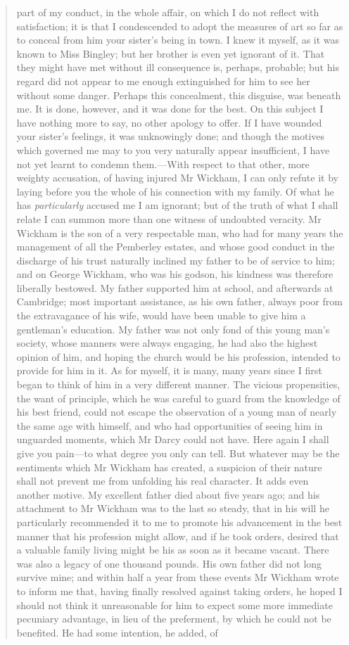 \begin{quotation}
part of my conduct, in the whole affair, on which I do not reflect with satisfaction; it is that I condescended to adopt the measures of art so far as to conceal from him your sister's being in town. I knew it myself, as it was known to Miss Bingley; but her brother is even yet ignorant of it. That they might have met without ill consequence is, perhaps, probable; but his regard did not appear to me enough extinguished for him to see her without some danger. Perhaps this concealment, this disguise, was beneath me. It is done, however, and it was done for the best. On this subject I have nothing more to say, no other apology to offer. If I have wounded your sister's feelings, it was unknowingly done; and though the motives which governed me may to you very naturally appear insufficient, I have not yet learnt to condemn them.—With respect to that other, more weighty accusation, of having injured Mr Wickham, I can only refute it by laying before you the whole of his connection with my family. Of what he has \textit{particularly} accused me I am ignorant; but of the truth of what I shall relate I can summon more than one witness of undoubted veracity. Mr Wickham is the son of a very respectable man, who had for many years the management of all the Pemberley estates, and whose good conduct in the discharge of his trust naturally inclined my father to be of service to him; and on George Wickham, who was his godson, his kindness was therefore liberally bestowed. My father supported him at school, and afterwards at Cambridge; most important assistance, as his own father, always poor from the extravagance of his wife, would have been unable to give him a gentleman's education. My father was not only fond of this young man's society, whose manners were always engaging, he had also the highest opinion of him, and hoping the church would be his profession, intended to provide for him in it. As for myself, it is many, many years since I first began to think of him in a very different manner. The vicious propensities, the want of principle, which he was careful to guard from the knowledge of his best friend, could not escape the observation of a young man of nearly the same age with himself, and who had opportunities of seeing him in unguarded moments, which Mr Darcy could not have. Here again I shall give you pain—to what degree you only can tell. But whatever may be the sentiments which Mr Wickham has created, a suspicion of their nature shall not prevent me from unfolding his real character. It adds even another motive. My excellent father died about five years ago; and his attachment to Mr Wickham was to the last so steady, that in his will he particularly recommended it to me to promote his advancement in the best manner that his profession might allow, and if he took orders, desired that a valuable family living might be his as soon as it became vacant. There was also a legacy of one thousand pounds. His own father did not long survive mine; and within half a year from these events Mr Wickham wrote to inform me that, having finally resolved against taking orders, he hoped I should not think it unreasonable for him to expect some more immediate pecuniary advantage, in lieu of the preferment, by which he could not be benefited. He had some intention, he added, of 
\end{quotation}
